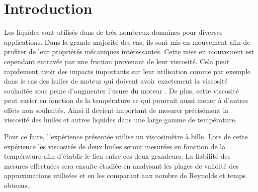 \section{Introduction}
Les liquides sont utilisés dans de très nombreux domaines pour diverses applications. Dans la grande majorité des cas, ils sont mis en mouvement afin de profiter de leur propriétés mécaniques intéressantes. Cette mise en mouvement est cependant entravée par une friction provenant de leur viscosité. Cela peut rapidement avoir des impacts importants sur leur utilisation comme par exemple dans le cas des huiles de moteur qui doivent avoir exactement la viscosité souhaitée sous peine d'augmenter l'usure du moteur \cite{roger_le_mecano}. De plus, cette viscosité peut varier en fonction de la température ce qui pourrait aussi mener à d'autres effets non souhaités. Ainsi il devient important de mesurer précisément la viscosité des huiles et autres liquides dans une large gamme de température.

Pour ce faire, l'expérience présentée utilise un viscosimètre à bille. Lors de cette expérience les viscosités de deux huiles seront mesurées en fonction de la température afin d'établir le lien entre ces deux grandeurs. La fiabilité des mesures effectuées sera ensuite étudiée en analysant les plages de validité des approximations utilisées et en les comparant aux nombre de Reynolds et temps obtenus.